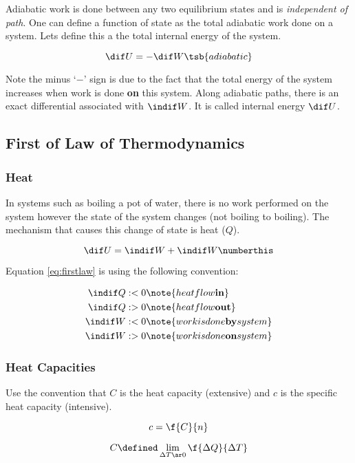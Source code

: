 \documentclass{article}
\begin{document}
Adiabatic work is done between any two equilibrium states and is \textit{independent of path}. One can define a function of state as the total adiabatic work done on a system. Lets define this a the total internal energy of the system.

\[ \dif U = - \dif W\tsb{adiabatic}\]

Note the minus `$-$' sign is due to the fact that the total energy of the system increases when work is done \textbf{on} this system. Along adiabatic paths, there is an exact differential associated with $\indif W$. It is called internal energy $\dif U$.

\subsection{First of Law of Thermodynamics}

\subsubsection{Heat}

In systems such as boiling a pot of water, there is no work performed on the system however the state of the system changes (not boiling to boiling). The mechanism that causes this change of state is heat ($Q$).

\[ \dif U = \indif W + \indif W \numberthis \label{eq:firstlaw} \]

Equation \eqref{eq:firstlaw} is using the following convention:

\begin{align*}
    \indif Q &:< 0 \note{heat flow \textbf{in}} \\
    \indif Q &:> 0 \note{heat flow \textbf{out}} \\
    \indif W &:< 0 \note{work is done \textbf{by} system} \\
    \indif W &:> 0 \note{work is done \textbf{on} system} \\
\end{align*}

\subsubsection{Heat Capacities}

Use the convention that $C$ is the heat capacity (extensive) and $c$ is the specific heat capacity (intensive).

\[ c = \f{C}{n} \]

\[ C \defined \lim_{\Delta T \ar 0} \f{\Delta Q}{\Delta T} \]
\end{document}
